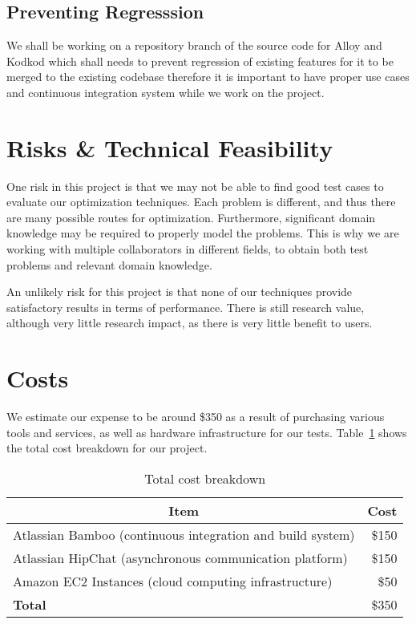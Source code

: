 \documentclass[11pt]{article}
\theoremstyle{definition}
\begin{document}
\subsection{Preventing Regresssion}\label{sec:regression}
We shall be working on a repository branch of the source code for Alloy and Kodkod which shall needs to prevent regression of existing features for it to be merged to the existing codebase therefore it is important to have proper use cases and continuous integration system while we work on the project.

\section{Risks \& Technical Feasibility}\label{sec:risks}
One risk in this project is that we may not be able to find good test
cases to evaluate our optimization techniques. Each problem is
different, and thus there are many possible routes for optimization.
Furthermore, significant domain knowledge may be required to properly
model the problems. This is why we are working with multiple
collaborators in different fields, to obtain both test problems and
relevant domain knowledge.

An unlikely risk for this project is that none of our techniques
provide satisfactory results in terms of performance. There is still
research value, although very little research impact, as there is very
little benefit to users.

\section{Costs}\label{sec:costs}
We estimate our expense to be around \$350 as a result of purchasing various tools and
services, as well as hardware infrastructure for our tests.
Table~\ref{tbl:costbreakdown} shows the total cost breakdown for our
project.

\begin{table}[H]
  \captionsetup{margin=30pt}
  \caption{Total cost breakdown}\label{tbl:costbreakdown}
  \centering
  \begin{tabular}{lr}
    \hline
    \multicolumn{1}{c}{\textbf{Item}} &
    \multicolumn{1}{c}{\textbf{Cost}} \\
    \hline
      Atlassian Bamboo (continuous integration and build system) & \$150 \\
      Atlassian HipChat (asynchronous communication platform) & \$150 \\
      Amazon EC2 Instances (cloud computing infrastructure) & \$50 \\
    \hline
    \textbf{Total} & \$350 \\
    \hline
  \end{tabular}
\end{table}
\end{document}
